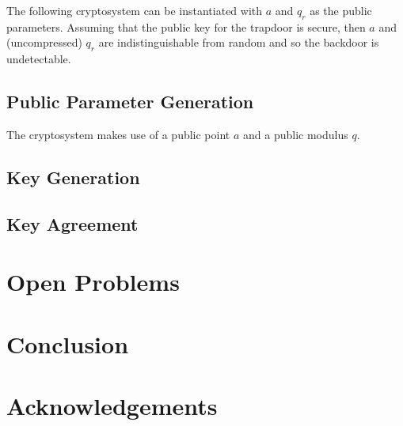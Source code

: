 \documentclass[preprint]{iacrtrans}
\begin{document}
The following cryptosystem can be instantiated with $a$ and $q_r$ as the public parameters. Assuming that the public key for the trapdoor is secure, then $a$ and (uncompressed) $q_r$ are indistinguishable from random and so the backdoor is undetectable.

\subsection{Public Parameter Generation}
The cryptosystem makes use of a public point $a$ and a public modulus $q$. 



\subsection{Key Generation}
\subsection{Key Agreement}
\section{Open Problems}
\todo{}

\section{Conclusion}
\todo{}

\section*{Acknowledgements}
\end{document}
